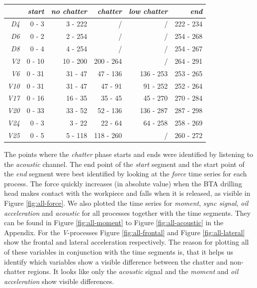 \documentclass[12 pt]{scrartcl}
\begin{document}
\begin{table}[ht]
  \centering
  \label{tab:segmenttime}
  \begin{tabular}{r|rrrrr}
               & \emph{start} & \emph{no chatter} & \emph{chatter} & \emph{low chatter} & \emph{end} \\
    \hline
    \emph{D4}  & 0 - 3        & 3  - 222          & /              & /                  & 222 - 234  \\
    \emph{D6}  & 0 - 2        & 2  - 254          & /              & /                  & 254 - 268  \\
    \emph{D8}  & 0 - 4        & 4  - 254          & /              & /                  & 254 - 267  \\
    \emph{V2}  & 0 - 10       & 10 - 200          & 200 - 264      & /                  & 264 - 291  \\
    \emph{V6}  & 0 - 31       & 31 - 47           & 47  - 136      & 136 - 253          & 253 - 265  \\
    \emph{V10} & 0 - 31       & 31 - 47           & 47  - 91       & 91  - 252          & 252 - 264  \\
    \emph{V17} & 0 - 16       & 16 - 35           & 35  - 45       & 45  - 270          & 270 - 284  \\
    \emph{V20} & 0 - 33       & 33 - 52           & 52  - 136      & 136 - 287          & 287 - 298  \\
    \emph{V24} & 0 - 3        & 3  - 22           & 22  - 64       & 64  - 258          & 258 - 269  \\
    \emph{V25} & 0 - 5        & 5  - 118          & 118 - 260      & /                  & 260 - 272  \\
  \end{tabular}
\end{table}

The points where the \emph{chatter} phase starts and ends were identified by listening to the \emph{acoustic} channel. The end point of the \emph{start} segment and the start point of the \emph{end} segment were best identified by looking at the \emph{force} time series for each process. The force quickly increases (in absolute value) when the BTA drilling head makes contact with the workpiece and falls when it is released, as visible in Figure \ref{fig:all-force}.
We also plotted the time series for \emph{moment}, \emph{sync signal}, \emph{oil acceleration} and \emph{acoustic} for all processes together with the time segments. They can be found in Figure \ref{fig:all-moment} to Figure \ref{fig:all-acoustic} in the Appendix. For the \emph{V}-processes Figure \ref{fig:all-frontal} and Figure \ref{fig:all-lateral} show the frontal and lateral acceleration respectively. The reason for plotting all of these variables in conjunction with the time segments is, that it helps us identify which variables show a visible difference between the chatter and non-chatter regions. It looks like only the \emph{acoustic} signal and the \emph{moment} and \emph{oil acceleration} show visible differences.
\end{document}
